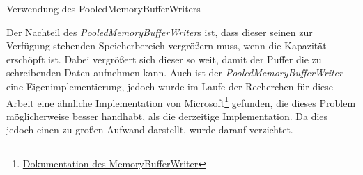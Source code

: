 \begin{listing}[H]
    \inputminted[framesep=2mm, baselinestretch=1.2, fontsize=\normalsize, linenos]{csharp}{codes/pooled_memory_buffer_writer_example.cs}
    \caption{Verwendung des PooledMemoryBufferWriters}
    \label{listing:verwendung-des-pooled-memory-buffer-writers}
\end{listing}

Der Nachteil des \textit{PooledMemoryBufferWriter}s ist, dass dieser seinen zur Verfügung stehenden Speicherbereich vergrößern muss, wenn die Kapazität erschöpft ist. Dabei vergrößert sich dieser so weit, damit der Puffer die zu schreibenden Daten aufnehmen kann. Auch ist der \textit{PooledMemoryBufferWriter} eine Eigenimplementierung, jedoch wurde im Laufe der Recherchen für diese Arbeit eine ähnliche Implementation von Microsoft\footnote{\href{https://docs.microsoft.com/en-us/dotnet/api/microsoft.toolkit.highperformance.buffers.memorybufferwriter-1?view=win-comm-toolkit-dotnet-7.0}{Dokumentation des MemoryBufferWriter}} gefunden, die dieses Problem möglicherweise besser handhabt, als die derzeitige Implementation. Da dies jedoch einen zu großen Aufwand darstellt, wurde darauf verzichtet.

\begin{table}[h]
    \caption{Benchmark mit 0 Options und mit einer Payload von 100000 Bytes}
    \label{tab:benchmark-0-100000}
\end{table}

